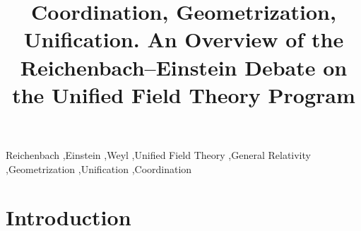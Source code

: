 \documentclass[draft]{article}
\title{Coordination, Geometrization, Unification. An Overview of the Reichenbach--Einstein Debate on the Unified Field Theory Program}
\newcommand{\phin}{\ensuremath{\varphi_\nu}\xspace}
\newcommand{\Lag}{\ensuremath{\mathcal{H}}\xspace}
\begin{document}
\maketitle

\begin{abstract}
\lipsum*[1-2]
\end{abstract}


\begin{keywords}
Reichenbach \sep Einstein \sep Weyl \sep Unified Field Theory \sep General Relativity \sep Geometrization \sep Unification \sep Coordination	
\end{keywords}

\section*{Introduction}



\end{document}
